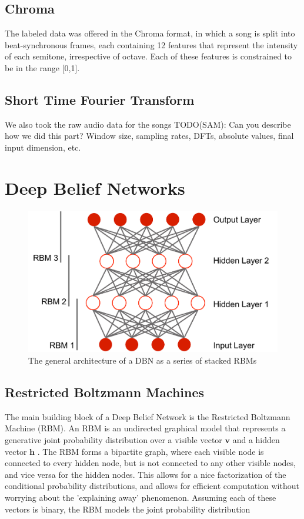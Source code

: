 \documentclass{article}
\begin{document}
\subsection{Chroma}
The labeled data was offered in the Chroma format, in which a song is split into
beat-synchronous frames, each containing 12 features that represent the
intensity of each semitone, irrespective of octave. Each of these features
is constrained to be in the range [0,1].

\subsection{Short Time Fourier Transform}
We also took the raw audio data for the songs 
TODO(SAM): Can you describe how we did this part? Window size, sampling rates,
DFTs, absolute values, final input dimension, etc.

\section{Deep Belief Networks}
\label{sec:DBN}

\begin{figure}[ht]
\vskip 0.2in
\begin{center}
\centerline{\includegraphics[width=\columnwidth]{images/deep_network_arch.pdf}}
\caption{The general architecture of a DBN as a series of stacked RBMs}
\label{dbn-arch}
\end{center}
\vskip -0.2in
\end{figure}

\subsection{Restricted Boltzmann Machines}

The main building block of a Deep Belief Network is the Restricted Boltzmann
Machine (RBM). An RBM is an undirected graphical model that represents a
generative joint probability distribution over a visible vector $\mathbf{v}$
and a hidden vector $\mathbf{h}$ \cite{mnih2012conditional}. The RBM forms a
bipartite graph, where each visible node is connected to every hidden node, but
is not connected to any other visible nodes, and vice versa for the hidden
nodes.  This allows for a nice factorization of the conditional probability
distributions, and allows for efficient computation without worrying about the
'explaining away' phenomenon. Assuming each of these vectors is binary,
the RBM models the joint probability distribution
\end{document}
